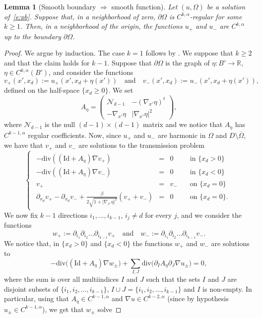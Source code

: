 \documentclass[JEP,XML,SOM,Unicode]{cedram}
\newcommand{\Id}{\mathrm{Id}}
\theoremstyle{plain}
\newtheorem{lemma}[teo]{Lemma}
\theoremstyle{definition}
\let\ds\displaystyle
\def\R{\mathbb{R}}
\begin{document}
\begin{lemma}[Smooth boundary $\Rightarrow$ smooth function]\label{l:reg1}
Let $(u,\Omega)$ be a solution of~\eqref{e:pb}. Suppose that, in a neighborhood of zero, $\partial\Omega$ is $C^{k,\alpha}$-regular for some $k\ge 1$. Then, in a neighborhood of the origin, the functions $u_+$ and $u_-$ are $C^{k,\alpha}$ up to the boundary $\partial\Omega$.
\end{lemma}
\begin{proof}
We argue by induction. The case $k=1$ follows by \cite{D}. We suppose that $k\ge 2$ and that the claim holds for $k-1$.
Suppose that $\partial\Omega$ is the graph of $\eta:B'\to\R$, $\eta\in C^{k,\alpha}(B')$, and consider the functions
\[v_+(x',x_d):=u_+(x',x_d+\eta(x'))\quad\text{and}\quad v_-(x',x_d):=u_-(x',x_d+\eta(x')),\]
defined on the half-space $\{x_d\ge 0\}$.
We set
\[A_\eta=\begin{pmatrix}
\mathcal N_{d-1} & -(\nabla_{\!x'}\eta)^t\\
-\nabla_{\!x'}\eta & |\nabla_{\!x'}\eta|^2
\end{pmatrix},\]
where $\mathcal N_{d-1} $ is the null $(d-1)\times (d-1)$ matrix and we notice that $A_\eta$ has $C^{k-1,\alpha}$ regular coefficients.
Now, since $u_+$ and $u_-$ are harmonic in $\Omega$ and $D\setminus\overline\Omega$, we have that $v_+$ and $v_-$ are solutions to the transmission problem
\[\begin{cases}
\begin{array}{rcll}
-\text{div}((\Id+A_\eta)\nabla v_+)&=&0&\quad\text{in }\{x_d>0\}\\
-\text{div}((\Id+A_\eta)\nabla v_-)&=&0&\quad\text{in }\{x_d<0\}\\
v_+&=&v_-&\quad\text{on }\{x_d=0\}\\
\ds\partial_{x_d}v_+-\partial_{x_d}v_-+\frac{\beta}{2\sqrt{1+|\nabla_{\!x'}\eta|^2}}(v_++v_-)&=&0&\quad\text{on }\{x_d=0\}.
\end{array}
\end{cases}\]
We now fix $k-1$ directions $i_1,\dots,i_{k-1}$, $i_j\neq d$ for every $j$, and we consider the functions
\[w_+:=\partial_{i_1}\partial_{i_2}\dots\partial_{i_{k-1}}v_+\quad\text{and}\quad w_-:=\partial_{i_1}\partial_{i_2}\dots\partial_{i_{k-1}}v_-.\]
We notice that, in $\{x_d>0\}$ and $\{x_{d}<0\}$ the functions $w_+$ and $w_-$ are solutions to
\[
\ds-\text{div}\big((\Id+A_\eta)\nabla w_\pm\big)+\sum_{I,J}\text{div}\big(\partial_IA_\eta\partial_J\nabla u_\pm\big)=0,\]
where the sum is over all multiindices $I$ and $J$ such that the sets $I$ and $J$ are disjoint subsets of $\{i_1,i_2,\dots,i_{k-1}\}$, $I\cup J=\{i_1,i_2,\dots,i_{k-1}\}$ and $I$ is non-empty. In particular, using that $A_\eta\in C^{k-1,\alpha}$ and $\nabla u\in C^{k-2,\alpha}$ (since by hypothesis $u_\pm\in C^{k-1,\alpha}$), we get that $w_\pm$ solve

\end{proof}
\end{document}
